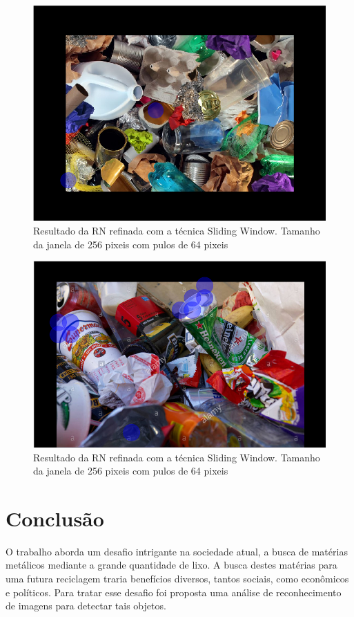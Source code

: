 \documentclass[conference, compsoc, 12pt]{IEEEtran}
\begin{document}
\begin{figure}[H]
    \centering
    \includegraphics[width=.9\linewidth]{trained_256_64.png}
    \caption{Resultado da RN refinada com a técnica Sliding Window. Tamanho da janela de 256 pixeis com pulos de 64 pixeis}
\end{figure}

\begin{figure}[H]
    \centering
    \includegraphics[width=.9\linewidth]{trained2_256_64.png}
    \caption{Resultado da RN refinada com a técnica Sliding Window. Tamanho da janela de 256 pixeis com pulos de 64 pixeis}
\end{figure}

\section{Conclusão}

O trabalho aborda um desafio intrigante na sociedade atual, a busca de matérias metálicos mediante a grande quantidade de lixo. A busca destes matérias para uma futura reciclagem traria benefícios diversos, tantos sociais, como econômicos e políticos. Para tratar esse desafio foi proposta uma análise de reconhecimento de imagens para detectar tais objetos.
\end{document}
